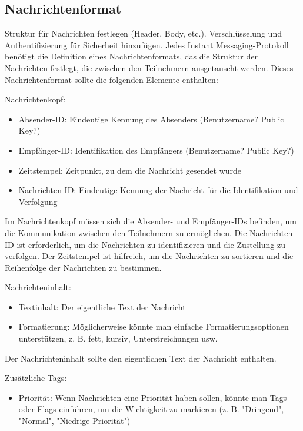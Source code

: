 \subsection{Nachrichtenformat}

Struktur für Nachrichten festlegen (Header, Body, etc.).
Verschlüsselung und Authentifizierung für Sicherheit hinzufügen.
Jedes Instant Messaging-Protokoll benötigt die Definition eines Nachrichtenformats,
das die Struktur der Nachrichten festlegt, die zwischen den Teilnehmern ausgetauscht werden.
Dieses Nachrichtenformat sollte die folgenden Elemente enthalten:

\noindent Nachrichtenkopf:
\begin{itemize}
    \item Absender-ID: Eindeutige Kennung des Absenders (Benutzername? Public Key?)
    \item Empfänger-ID: Identifikation des Empfängers (Benutzername? Public Key?)
    \item Zeitstempel: Zeitpunkt, zu dem die Nachricht gesendet wurde
    \item Nachrichten-ID: Eindeutige Kennung der Nachricht für die Identifikation 
    und Verfolgung
\end{itemize}

Im Nachrichtenkopf müssen sich die Absender- und Empfänger-IDs befinden,
um die Kommunikation zwischen den Teilnehmern zu ermöglichen.
Die Nachrichten-ID ist erforderlich, um die Nachrichten zu identifizieren und
die Zustellung zu verfolgen. Der Zeitstempel ist hilfreich, um die Nachrichten
zu sortieren und die Reihenfolge der Nachrichten zu bestimmen.


\noindent Nachrichteninhalt:
\begin{itemize}
    \item Textinhalt: Der eigentliche Text der Nachricht
    \item Formatierung: Möglicherweise könnte man einfache Formatierungsoptionen 
    unterstützen, z. B. fett, kursiv, Unterstreichungen usw.
\end{itemize}

Der Nachrichteninhalt sollte den eigentlichen Text der Nachricht enthalten.


\noindent Zusätzliche Tags:
\begin{itemize}
    \item Priorität: Wenn Nachrichten eine Priorität haben sollen, könnte 
    man Tags oder Flags einführen, um die Wichtigkeit zu markieren 
    (z. B. "Dringend", "Normal", "Niedrige Priorität")
\end{itemize}


